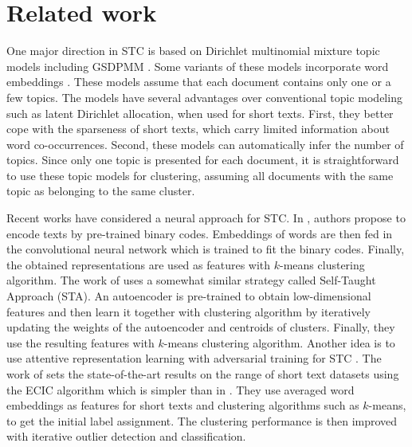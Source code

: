 \documentclass[11pt,a4paper]{article}
\begin{document}
\section{Related work}
One major direction in STC is based on Dirichlet multinomial mixture topic models \cite{yin2014dirichlet,jipeng2019short} including GSDPMM \cite{yin2016model}. Some variants of these models incorporate word embeddings \cite{nguyen2015improving,li2017enhancing,jipeng2019short}. These models assume that each document contains only one or a few topics. The models have several advantages over conventional topic modeling such as latent Dirichlet allocation, when used for short texts. First, they better cope with the sparseness of short texts, which carry limited information about word co-occurrences. Second, these models can automatically infer the number of topics. Since only one topic is presented for each document, it is straightforward to use these topic models for clustering, assuming all documents with the same topic as belonging to the same cluster.

Recent works have considered a neural approach for STC. In \cite{xu2015short, xu2017self}, authors propose to encode texts by pre-trained binary codes. Embeddings of words are then fed in the convolutional neural network which is trained to fit the binary codes. Finally, the obtained representations are used as features with $k$-means clustering algorithm. The work of \cite{hadifar2019self} uses a somewhat similar strategy called Self-Taught Approach (STA). An autoencoder is pre-trained to obtain low-dimensional features and then learn it together with clustering algorithm by iteratively updating the weights of the autoencoder and centroids of clusters. Finally, they use the resulting features with $k$-means clustering algorithm. Another idea is to use attentive representation learning with adversarial training for STC \cite{zhang2019attentive}. The work of \cite{rakib2020enhancement} sets the state-of-the-art results on the range of short text datasets using the ECIC algorithm which is simpler than in \cite{hadifar2019self}. They use averaged word embeddings as features for short texts and clustering algorithms such as $k$-means, to get the initial label assignment. The clustering performance is then improved with iterative outlier detection and classification.
\end{document}
